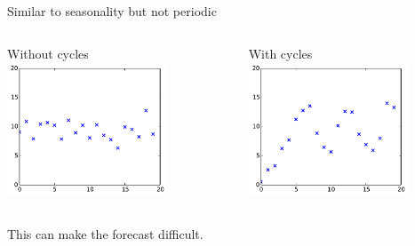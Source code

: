 \documentclass{beamer}
\begin{document}
\begin{frame}{}
 Similar to seasonality but not periodic\\
\vspace{5mm}
\begin{columns}[c]
\column{5cm}
\begin{center}
Without cycles
\includegraphics[height=4cm]{figures/2_cyclicalno}
\end{center}
\column{5cm}
\begin{center}
With cycles
\includegraphics[height=4cm]{figures/2_cyclical}
\end{center}
\end{columns}
\vspace{5mm}
This can make the forecast difficult.
\end{frame}
\end{document}
